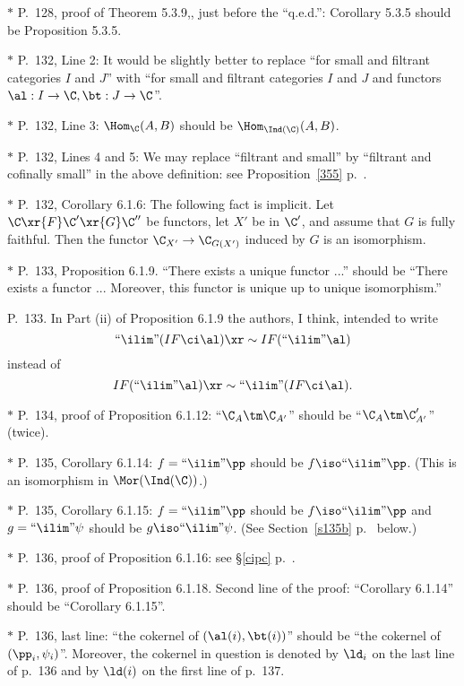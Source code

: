 \documentclass[12pt]{article}
\theoremstyle{remark}
\theoremstyle{definition}
\begin{document}
\nn$*$ P.~128, proof of Theorem 5.3.9,, just before the ``q.e.d.'': Corollary 5.3.5 should be Proposition 5.3.5.

\nn$*$ P.~132, Line 2: It would be slightly better to replace ``for small and filtrant categories $I$ and $J$'' with ``for small and filtrant categories $I$ and $J$ and functors $\al:I\to\C,\bt:J\to\C$''.

\nn$*$ P.~132, Line 3: $\Hom_\C(A,B)$ should be $\Hom_{\Ind(\C)}(A,B)$.

\nn$*$ P.~132, Lines 4 and 5: \guillemotleft We may replace ``filtrant and small'' by ``filtrant and cofinally small'' in the above definition\guillemotright: see Proposition~\ref{355} p.~.

\nn$*$ P.~132, Corollary 6.1.6: The following fact is implicit. Let $\C\xr{F}\C'\xr{G}\C''$ be functors, let $X'$ be in $\C'$, and assume that $G$ is fully faithful. Then the functor $\C_{X'}\to\C_{G(X')}$ induced by $G$ is an isomorphism.

\nn$*$ P.~133, Proposition 6.1.9. ``There exists a unique functor ...'' should be ``There exists a functor ... Moreover, this functor is unique up to unique isomorphism.''

\begin{s} 
P.~133. In Part (ii) of Proposition 6.1.9 the authors, I think, intended to write 
$$
``\ilim"(IF\ci\al)\xr\sim IF(``\ilim"\al)
$$
instead of 
$$
IF(``\ilim"\al)\xr\sim``\ilim"(IF\ci\al). 
$$ 
\end{s}

\nn$*$ P.~134, proof of Proposition 6.1.12: ``$\C_A\tm\C_{A'}$'' should be ``$\C_A\tm\C'_{A'}$'' (twice).

\nn$*$ P.~135, Corollary 6.1.14: $f=``\ilim"\pp$ should be $f\iso``\ilim"\pp$. (This is an isomorphism in $\Mor(\Ind(\C))$.)

\begin{s}
$*$ P.~135, Corollary 6.1.15: $f=``\ilim"\pp$ should be $f\iso``\ilim"\pp$ and $g=``\ilim"\psi$ should be $g\iso``\ilim"\psi$. (See Section~\ref{s135b} p.~ below.)
\end{s}

\nn$*$ P.~136, proof of Proposition 6.1.16: see \S\ref{cipc} p.~.

\nn$*$ P.~136, proof of Proposition 6.1.18. Second line of the proof: ``Corollary 6.1.14'' should be ``Corollary 6.1.15''. 

\nn$*$ P.~136, last line: ``the cokernel of $(\al(i),\bt(i))$'' should be ``the cokernel of $(\pp_i,\psi_i)$''. Moreover, the cokernel in question is denoted by $\ld_i$ on the last line of p.~136 and by $\ld(i)$ on the first line of p.~137.
\end{document}
